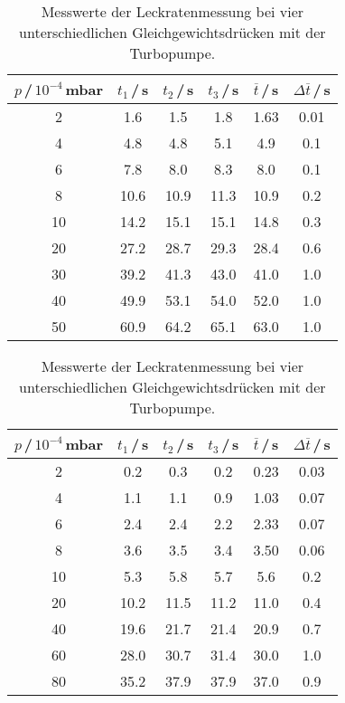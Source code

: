 \begin{table}
  \caption{Messwerte der Leckratenmessung bei vier unterschiedlichen Gleichgewichtsdrücken mit der Turbopumpe.}
  \begin{subtable}{0.49\textwidth}
    \hspace{-1.5cm}
    \begin{tabular}{c|c|c|c|c|c}\label{tab:Leck5Turbo}
      $p$\,/\,$10^{-4}$\,mbar & $t_1$\,/\,s & $t_2$\,/\,s & $t_3$\,/\,s & $\overline{t}$\,/\,s & $\Delta\overline{t}$\,/\,s \\
      \midrule
      2  & 1.6  & 1.5  & 1.8  & 1.63 & 0.01 \\
      4  & 4.8  & 4.8  & 5.1  & 4.9  & 0.1  \\
      6  & 7.8  & 8.0  & 8.3  & 8.0  & 0.1  \\
      8  & 10.6 & 10.9 & 11.3 & 10.9 & 0.2  \\
      10 & 14.2 & 15.1 & 15.1 & 14.8 & 0.3  \\
      20 & 27.2 & 28.7 & 29.3 & 28.4 & 0.6  \\
      30 & 39.2 & 41.3 & 43.0 & 41.0 & 1.0  \\
      40 & 49.9 & 53.1 & 54.0 & 52.0 & 1.0  \\
      50 & 60.9 & 64.2 & 65.1 & 63.0 & 1.0  \\
    \end{tabular}
  \end{subtable}\hspace{2cm}
  \begin{subtable}{0.49\textwidth}
    \hspace{-1.5cm}
    \begin{tabular}{c|c|c|c|c|c}\label{tab:Leck10Turbo}
      $p$\,/\,$10^{-4}$\,mbar & $t_1$\,/\,s & $t_2$\,/\,s &   $t_3$\,/\,s & $\overline{t}$\,/\,s & $\Delta\overline{t}$\,/\,s \\
      \midrule
      2  & 0.2  & 0.3  & 0.2  & 0.23 & 0.03 \\
      4  & 1.1  & 1.1  & 0.9  & 1.03 & 0.07 \\
      6  & 2.4  & 2.4  & 2.2  & 2.33 & 0.07 \\
      8  & 3.6  & 3.5  & 3.4  & 3.50 & 0.06 \\
      10 & 5.3  & 5.8  & 5.7  & 5.6  & 0.2  \\
      20 & 10.2 & 11.5 & 11.2 & 11.0 & 0.4  \\
      40 & 19.6 & 21.7 & 21.4 & 20.9 & 0.7  \\
      60 & 28.0 & 30.7 & 31.4 & 30.0 & 1.0  \\
      80 & 35.2 & 37.9 & 37.9 & 37.0 & 0.9  \\
    \end{tabular}
  \end{subtable}


\end{table}
